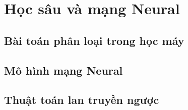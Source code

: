 \section{Học sâu và mạng Neural}

\subsection{Bài toán phân loại trong học máy}


\subsection{Mô hình mạng Neural}

\subsection{Thuật toán lan truyền ngược}
